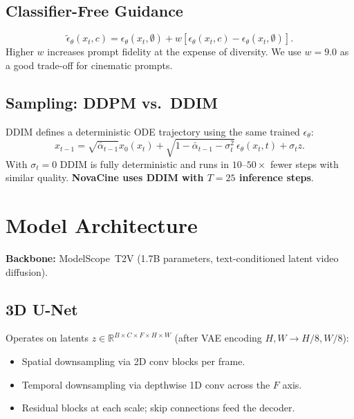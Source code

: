 \documentclass[conference]{IEEEtran}
\begin{document}
\subsection{Classifier-Free Guidance}
\begin{equation}
\tilde{\epsilon}_\theta(x_t,c) = \epsilon_\theta(x_t,\emptyset) + w\!\left[\epsilon_\theta(x_t,c) - \epsilon_\theta(x_t,\emptyset)\right].
\end{equation}
Higher $w$ increases prompt fidelity at the expense of diversity.
We use $w=9.0$ as a good trade-off for cinematic prompts.

\subsection{Sampling: DDPM vs.\ DDIM}
DDIM defines a deterministic ODE trajectory using the same trained
$\epsilon_\theta$:
\begin{equation}
x_{t-1} = \sqrt{\bar{\alpha}_{t-1}}\hat{x}_0(x_t) + \sqrt{1-\bar{\alpha}_{t-1}-\sigma_t^2}\,\epsilon_\theta(x_t,t) + \sigma_t z.
\end{equation}
With $\sigma_t = 0$ DDIM is fully deterministic and runs in
$10$--$50\times$ fewer steps with similar quality.
\textbf{NovaCine uses DDIM with $T=25$ inference steps}.

\section{Model Architecture}

\textbf{Backbone:} ModelScope~T2V (1.7B parameters,
text-conditioned latent video diffusion).

\subsection{3D U-Net}
Operates on latents $z\in\mathbb{R}^{B\times C\times F\times H\times W}$
(after VAE encoding $H,W \to H/8,W/8$):
\begin{itemize}
  \item Spatial downsampling via 2D conv blocks per frame.
  \item Temporal downsampling via depthwise 1D conv across the $F$ axis.
  \item Residual blocks at each scale; skip connections feed the decoder.
\end{itemize}
\end{document}
